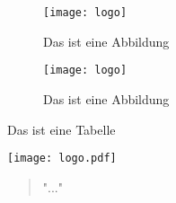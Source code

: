 \begin{figure}[htbp] 
    \centering
    \texttt{[image: logo]}
    \caption{Das ist eine Abbildung}
    \label{fig:pic1}
\end{figure}

\begin{wrapfigure}{R}{0.5\textwidth}
    \centering
    \texttt{[image: logo]}
    \caption{Das ist eine Abbildung}
    \label{fig:pic1}
\end{wrapfigure}

\begin{table}
    \centering
    \caption{Das ist eine Tabelle}
    \texttt{[image: logo.pdf]}
    \label{tab:tab1}
\end{table}

\cite{key} %
\parencite{key} %
\parencite[Seite 3]{key} %
\textcite{key} %
\citeauthor{key} %
\citeyear{key} %
\begin{quote} "..."  \end{quote} %
